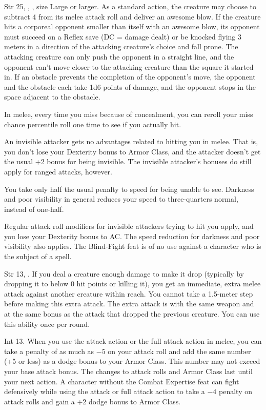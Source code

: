 
{Str 25, , , size Large or larger.}
{As a standard action, the creature may choose to subtract 4 from its melee attack roll and deliver an awesome blow. If the creature hits a corporeal opponent smaller than itself with an awesome blow, its opponent must succeed on a Reflex save (DC = damage dealt) or be knocked flying 3 meters in a direction of the attacking creature's choice and fall prone. The attacking creature can only push the opponent in a straight line, and the opponent can't move closer to the attacking creature than the square it started in. If an obstacle prevents the completion of the opponent's move, the opponent and the obstacle each take 1d6 points of damage, and the opponent stops in the space adjacent to the obstacle.}

{}{}
{In melee, every time you miss because of concealment, you can reroll your miss chance percentile roll one time to see if you actually hit.

An invisible attacker gets no advantages related to hitting you in melee. That is, you don't lose your Dexterity bonus to Armor Class, and the attacker doesn't get the usual +2 bonus for being invisible. The invisible attacker's bonuses do still apply for ranged attacks, however.

You take only half the usual penalty to speed for being unable to see. Darkness and poor visibility in general reduces your speed to three-quarters normal, instead of one-half.}
{Regular attack roll modifiers for invisible attackers trying to hit you apply, and you lose your Dexterity bonus to AC. The speed reduction for darkness and poor visibility also applies.}
{The Blind-Fight feat is of no use against a character who is the subject of a  spell.}{}

{Str 13, .}
{If you deal a creature enough damage to make it drop (typically by dropping it to below 0 hit points or killing it), you get an immediate, extra melee attack against another creature within reach. You cannot take a 1.5-meter step before making this extra attack. The extra attack is with the same weapon and at the same bonus as the attack that dropped the previous creature. You can use this ability once per round.}

{}
{Int 13.}
{When you use the attack action or the full attack action in melee, you can take a penalty of as much as $-5$ on your attack roll and add the same number (+5 or less) as a dodge bonus to your Armor Class. This number may not exceed your base attack bonus. The changes to attack rolls and Armor Class last until your next action.}
{A character without the Combat Expertise feat can fight defensively while using the attack or full attack action to take a $-4$ penalty on attack rolls and gain a +2 dodge bonus to Armor Class.}{}

